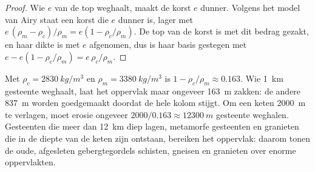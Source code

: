\begin{proof}
Wie $e$ van de top weghaalt, maakt de korst $e$ dunner. Volgens het model van Airy
staat een korst die $e$ dunner is, lager met $e\,(\rho_m - \rho_c)/\rho_m = e(1 -
\rho_c/\rho_m)$. De top van de korst is met dit bedrag gezakt, en haar
dikte is met $e$ afgenomen, dus is haar basis gestegen met $e - e(1 -
\rho_c/\rho_m) = e\,\rho_c/\rho_m$.
\end{proof}

Met $\rho_c = \qty{2830}{kg/m^3}$ en $\rho_m = \qty{3380}{kg/m^3}$ is $1 -
\rho_c/\rho_m \approx 0.163$. Wie \qty{1}{km} gesteente weghaalt, laat het
oppervlak maar ongeveer \qty{163}{m} zakken: de andere \qty{837}{m} worden goedgemaakt doordat de
hele kolom stijgt. Om een keten \qty{2000}{m} te verlagen, moet erosie
ongeveer $2000/0.163 \approx \qty{12300}{m}$ gesteente weghalen. Gesteenten die meer dan
\qty{12}{km} diep lagen, metamorfe gesteenten en granieten die in de diepte van de
keten zijn ontstaan, bereiken het oppervlak: daarom tonen de oude, afgesleten gebergtegordels
schisten, gneisen en granieten over enorme oppervlakten.

